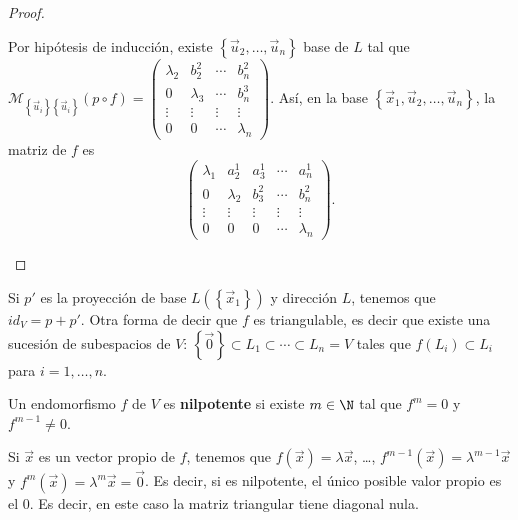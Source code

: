 \begin{proof}
\begin{description}
	Por hipótesis de inducción, existe $\displaystyle \left\{ \vec{u}_{2}, \ldots, \vec{u}_{n}\right\}  $ base de $\displaystyle L $ tal que $\displaystyle \mathcal{M}_{ \left\{ \vec{u}_{i}\right\} \left\{ \vec{u}_{i}\right\} }\left(p \circ f\right) = \begin{pmatrix} \lambda_{2} & b^{2}_{2} & \cdots & b^{2}_{n} \\
	0 & \lambda_{3} & \cdots & b^{3}_{n} \\
\vdots & \vdots & \vdots & \vdots \\
0 & 0 & \cdots & \lambda_{n}\end{pmatrix} $. Así, en la base $\displaystyle \left\{ \vec{x}_{1}, \vec{u}_{2}, \ldots, \vec{u}_{n}\right\}  $, la matriz de $\displaystyle f $ es
		\[\begin{pmatrix} \lambda_{1} & a^{1}_{2} & a^{1}_{3} & \cdots & a^{1}_{n}\\
		0 & \lambda_{2} & b^{2}_{3} & \cdots & b^{2}_{n} \\
	\vdots & \vdots & \vdots & \vdots & \vdots \\
0 & 0 & 0 & \cdots & \lambda_{n}\end{pmatrix} .\]
\end{description}
\end{proof}
\begin{observation}
\normalfont 
Si $\displaystyle p' $ es la proyección de base $\displaystyle L\left( \left\{ \vec{x}_{1}\right\} \right) $ y dirección $\displaystyle L $, tenemos que $\displaystyle id _{V} = p + p' $. Otra forma de decir que $\displaystyle f $ es triangulable, es decir que existe una sucesión de subespacios de $\displaystyle V $: $\displaystyle \left\{ \vec{0}\right\}  \subset L_{1} \subset \cdots \subset L_{n} = V $ tales que $\displaystyle f\left(L_{i}\right) \subset L_{i} $ para $\displaystyle i = 1, \ldots, n $.
\end{observation}

\begin{fdefinition}[]
\normalfont Un endomorfismo $\displaystyle f $ de $\displaystyle V $ es \textbf{nilpotente} si existe $\displaystyle m \in \N $ tal que $\displaystyle f^{m} = 0 $ y $\displaystyle f^{m - 1} \neq 0 $. 
\end{fdefinition}
\begin{observation}
\normalfont Si $\displaystyle \vec{x}  $ es un vector propio de $\displaystyle f $, tenemos que $\displaystyle f\left(\vec{x}\right) = \lambda \vec{x} $, \ldots, $\displaystyle f^{m - 1}\left(\vec{x}\right) = \lambda^{m - 1}\vec{x} $ y $\displaystyle f^{m}\left(\vec{x}\right) =\lambda^{m}\vec{x}=\vec{0} $. Es decir, si es nilpotente, el único posible valor propio es el 0. Es decir, en este caso la matriz triangular tiene diagonal nula.
\end{observation}
